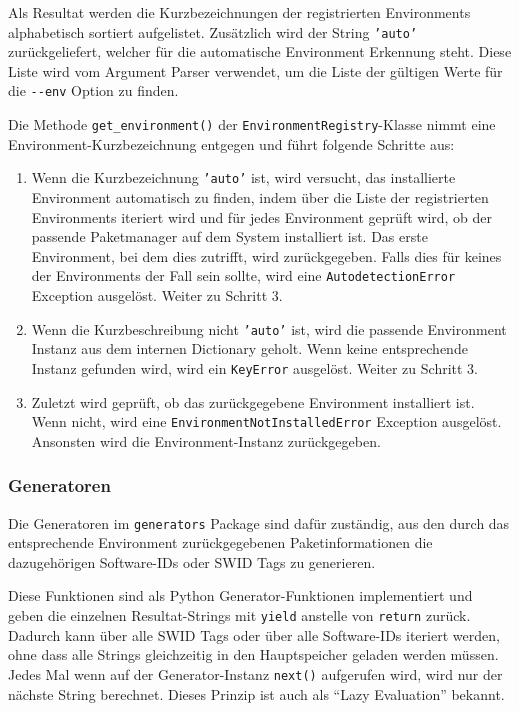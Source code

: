 Als Resultat werden die Kurzbezeichnungen der registrierten Environments
alphabetisch sortiert aufgelistet. Zusätzlich wird der String \texttt{'auto'}
zurückgeliefert, welcher für die automatische Environment Erkennung steht. Diese
Liste wird vom Argument Parser verwendet, um die Liste der gültigen Werte für die
\texttt{-{}-env} Option zu finden.

Die Methode \texttt{get\_environment()} der \texttt{EnvironmentRegistry}-Klasse
nimmt eine Environment-Kurzbezeichnung entgegen und führt folgende Schritte aus:

\begin{enumerate}
	\item Wenn die Kurzbezeichnung \texttt{'auto'} ist, wird versucht, das
	installierte Environment automatisch zu finden, indem über die Liste der
	registrierten Environments iteriert wird und für jedes Environment geprüft
	wird, ob der passende Paketmanager auf dem System installiert ist. Das erste
	Environment, bei dem dies zutrifft, wird zurückgegeben. Falls dies für keines
	der Environments der Fall sein sollte, wird eine \texttt{AutodetectionError}
	Exception ausgelöst. Weiter zu Schritt 3.
	
	\item Wenn die Kurzbeschreibung nicht \texttt{'auto'} ist, wird die passende
	Environment Instanz aus dem internen Dictionary geholt. Wenn keine
	entsprechende Instanz gefunden wird, wird ein \texttt{KeyError} ausgelöst. Weiter zu Schritt 3.
		
	\item Zuletzt wird geprüft, ob das zurückgegebene Environment installiert
	ist. Wenn nicht, wird eine \texttt{EnvironmentNotInstalledError} Exception
	ausgelöst. Ansonsten wird die Environment-Instanz zurückgegeben.
\end{enumerate}

\subsubsection{Generatoren}
\label{swidgenerator:architektur:generatoren}

Die Generatoren im \texttt{generators} Package sind dafür zuständig, aus den
durch das entsprechende Environment zurückgegebenen Paketinformationen die
dazugehörigen Software-IDs oder SWID Tags zu generieren.

Diese Funktionen sind als Python Generator-Funktionen\cite[S.~94-95]{alchin2010pro}
implementiert und geben die einzelnen Resultat-Strings mit \texttt{yield}
anstelle von \texttt{return} zurück. Dadurch kann über alle SWID Tags oder über
alle Software-IDs iteriert werden, ohne dass alle Strings gleichzeitig in den
Hauptspeicher geladen werden müssen. Jedes Mal wenn auf der Generator-Instanz
\texttt{next()} aufgerufen wird, wird nur der nächste String berechnet. Dieses
Prinzip ist auch als \enquote{Lazy Evaluation}\cite[S.~85--93]{meyers1995more}
bekannt.

